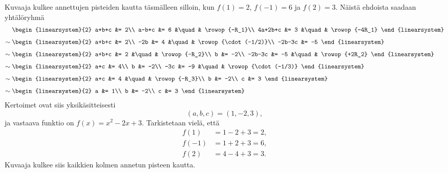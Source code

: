 \documentclass[11pt,a4paper]{amsart}
\begin{document}
\begin{solution}
Kuvaaja kulkee annettujen pisteiden kautta täsmälleen silloin, kun
\(f(1)=2\), \(f(-1)=6\) ja \(f(2)=3\). Näistä ehdoista saadaan yhtälöryhmä
\[
\begin{aligned}
  &
  \begin{linearsystem}{2}
    a+b+c &= 2\\
    a-b+c &= 6 &\quad& \rowop{-R_1}\\
    4a+2b+c &= 3 &\quad& \rowop{-4R_1}
  \end{linearsystem}\\[1ex]
  \sim{}&
  \begin{linearsystem}{2}
    a+b+c &= 2\\
    -2b &= 4 &\quad& \rowop{\cdot(-1/2)}\\
    -2b-3c &= -5
  \end{linearsystem}\\[1ex]
  \sim{}&
  \begin{linearsystem}{2}
    a+b+c &= 2 &\quad& \rowop{-R_2}\\
    b &= -2\\
    -2b-3c &= -5 &\quad& \rowop{+2R_2}
  \end{linearsystem}\\[1ex]
  \sim{}&
  \begin{linearsystem}{2}
    a+c &= 4\\
    b &= -2\\
    -3c &= -9 &\quad& \rowop{\cdot(-1/3)}
  \end{linearsystem}\\[1ex]
  \sim{}&
  \begin{linearsystem}{2}
    a+c &= 4 &\quad& \rowop{-R_3}\\
    b &= -2\\
    c &= 3
  \end{linearsystem}\\[1ex]
  \sim{}&
  \begin{linearsystem}{2}
    a &= 1\\
    b &= -2\\
    c &= 3
  \end{linearsystem}
\end{aligned}
\]
Kertoimet ovat siis yksikäsitteisesti
\[
(a,b,c)=(1,-2,3),
\]
ja vastaava funktio on \(f(x)=x^2-2x+3\). Tarkistetaan vielä, että
\[
\begin{aligned}
  f(1) &= 1-2+3=2, \\
  f(-1) &= 1+2+3=6, \\
  f(2) &= 4-4+3=3.
\end{aligned}
\]
Kuvaaja kulkee siis kaikkien kolmen annetun pisteen kautta.
\end{solution}
\end{document}
